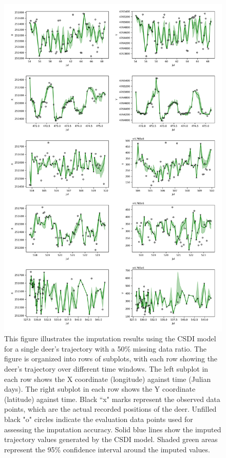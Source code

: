 \documentclass[11pt]{article}
\begin{document}
\begin{figure}[h]
  \centering
  \includegraphics[width=\textwidth]{../figure/50_5094_csdi} %
  \caption{This figure illustrates the imputation results using the CSDI model for a single deer's trajectory with a 50\% missing data ratio. The figure is organized into rows of subplots, with each row showing the deer's trajectory over different time windows. The left subplot in each row shows the X coordinate (longitude) against time (Julian days). The right subplot in each row shows the Y coordinate (latitude) against time. Black ``x" marks represent the observed data points, which are the actual recorded positions of the deer. Unfilled black "o" circles indicate the evaluation data points used for assessing the imputation accuracy. Solid blue lines show the imputed trajectory values generated by the CSDI model. Shaded green areas represent the 95\% confidence interval around the imputed values.}
  \label{fig: csdi_50} %
\end{figure}
\end{document}
